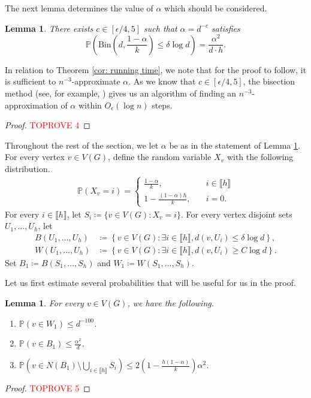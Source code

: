 \documentclass[notitlepage]{scrartcl}
\newcommand{\br}[1]{\llbracket{#1}\rrbracket}
\newtheorem{lemma}[thm]{Lemma}
\renewcommand{\Pr}{\mathbb{P}}
\begin{document}
The next lemma determines the value of $\alpha$ which should be considered.
\begin{lemma}\label{l:alpha-choice}
There exists $c \in [\epsilon/4, 5]$ such that $\alpha = d^{-c}$ satisfies
\[
        \mathbb{P}\left(\text{Bin}\left(d, \frac{1 - \alpha}{k}\right) \le \delta \log d\right) = \frac{\alpha^2}{d\cdot h}.
\]
\end{lemma}
In relation to Theorem \ref{cor: running time}, we note that for the proof to follow, it is sufficient to $n^{-3}$-approximate $\alpha$. As we know that $c\in [\epsilon/4,5]$, the bisection method   (see, for example, \cite{BF93}) gives us an algorithm of finding an $n^{-3}$-approximation of $\alpha$ within $O_{\epsilon}(\log n)$ steps.  
\begin{proof}\textcolor{red}{TOPROVE 4}\end{proof}

Throughout the rest of the section, we let $\alpha$ be as in the statement of Lemma \ref{l:alpha-choice}. For every vertex $v \in V(G)$, define the random variable $X_v$ with the following distribution.
\begin{align*}
    \Pr(X_v = i) = \begin{cases}
        \frac{1 - \alpha}{k}, \quad & i \in \br{h} \\
        1-\frac{(1-\alpha)h}{k}, \quad & i = 0.
    \end{cases}
\end{align*}
For every $i \in \br{h}$, let $S_i \coloneqq \{v\in V(G)\colon X_v=i\}$. For every vertex disjoint sets $U_1,\ldots, U_h$, let 
\begin{align*}
    B(U_1,\ldots, U_h)&\coloneqq \left\{v\in V(G)\colon \exists i\in \br{h}, d(v, U_i)\le \delta\log d\right\},\\
    W(U_1,\ldots, U_h)&\coloneqq \left\{v\in V(G)\colon \exists i \in \br{h}, d(v,U_i)\ge C\log d\right\}.
\end{align*}
Set $B_1\coloneqq B(S_1,\ldots, S_h)$ and $W_1\coloneqq W(S_1,\ldots, S_h)$.

Let us first estimate several probabilities that will be useful for us in the proof. 
\begin{lemma}\label{l: probabilities of b1 and w1}
For every $v\in V(G)$, we have the following.
\begin{enumerate}
    \item $\mathbb{P}\left(v\in W_1\right)\le d^{-100}$.
    \item $\mathbb{P}\left(v\in B_1\right)\le \frac{\alpha^2}{d}$.
    \item $\mathbb{P}\left(v\in N(B_1)\setminus \bigcup_{i\in \br{h}}S_i\right)\le 2\left(1-\frac{h(1-\alpha)}{k}\right)\alpha^2$.
\end{enumerate}
\end{lemma}
\begin{proof}\textcolor{red}{TOPROVE 5}\end{proof}
\end{document}
